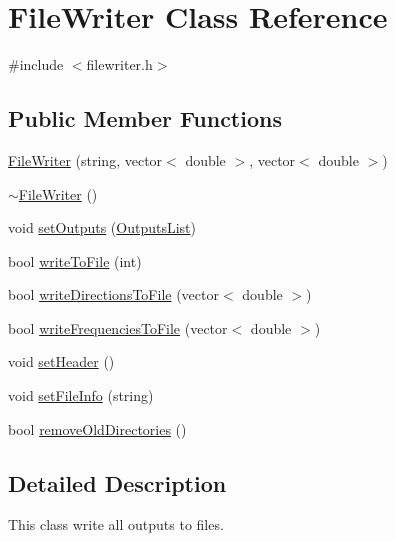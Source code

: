 \hypertarget{class_file_writer}{\section{File\-Writer Class Reference}
\label{class_file_writer}
}


{\ttfamily \#include $<$filewriter.\-h$>$}

\subsection*{Public Member Functions}
\begin{DoxyCompactItemize}
\item 
\hyperlink{class_file_writer_a570c654285dedf2eed41794698488268}{File\-Writer} (string, vector$<$ double $>$, vector$<$ double $>$)
\item 
\hyperlink{class_file_writer_ae5490307dcaf9237f4c1b8b8df433e03}{$\sim$\-File\-Writer} ()
\item 
void \hyperlink{class_file_writer_a12fb8cd23937a257e4db0bfade0b2480}{set\-Outputs} (\hyperlink{class_outputs_list}{Outputs\-List})
\item 
bool \hyperlink{class_file_writer_ada65187529c9aceb2be0a66085b745c5}{write\-To\-File} (int)
\item 
bool \hyperlink{class_file_writer_a692853a3380d47586fdc186ca3e62a45}{write\-Directions\-To\-File} (vector$<$ double $>$)
\item 
bool \hyperlink{class_file_writer_a5dd1b1384aac1febb75c21194e43f29e}{write\-Frequencies\-To\-File} (vector$<$ double $>$)
\item 
void \hyperlink{class_file_writer_aeea3ca877f0c5280b22ea7ff653db233}{set\-Header} ()
\item 
void \hyperlink{class_file_writer_aa01e35cc83c9ddee419c2b08cf12e919}{set\-File\-Info} (string)
\item 
bool \hyperlink{class_file_writer_a3c651fa84b2cce465f2ec0fce8be2464}{remove\-Old\-Directories} ()
\end{DoxyCompactItemize}


\subsection{Detailed Description}
This class write all outputs to files. 

